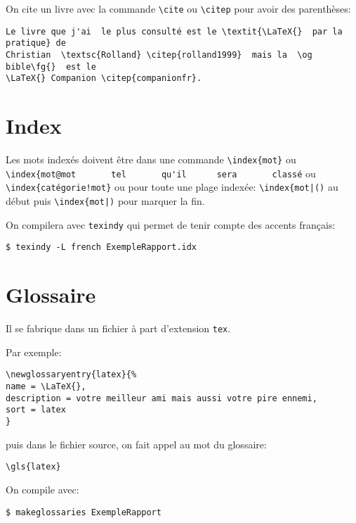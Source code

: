 \lat

On cite un  livre avec la commande \lstinline+\cite+  ou \lstinline+\citep+ pour
avoir des parenthèses:

\begin{lstlisting}
Le livre que j'ai  le plus consulté est le \textit{\LaTeX{}  par la pratique} de
Christian  \textsc{Rolland} \citep{rolland1999}  mais la  \og bible\fg{}  est le
\LaTeX{} Companion \citep{companionfr}.
\end{lstlisting}


\section{Index}


Les  mots indexés  doivent  être dans  une  commande \lstinline+\index{mot}+  ou
\lstinline+\index{mot@mot       tel       qu'il      sera       classé+       ou
  \lstinline+\index{catégorie!mot}+   ou   pour   toute   une   plage   indexée:
  \lstinline+\index{mot|()+ au début puis \lstinline+\index{mot|)+ pour 
 marquer la fin.

On compilera  avec \lstinline+texindy+  qui permet de  tenir compte  des accents
français:

\shell

\begin{lstlisting}
$ texindy -L french ExempleRapport.idx
\end{lstlisting}


\section{Glossaire}

Il se fabrique dans un fichier à part d'extension \texttt{tex}.

 Par exemple:

\lat

\begin{lstlisting}
\newglossaryentry{latex}{%
name = \LaTeX{},
description = votre meilleur ami mais aussi votre pire ennemi,
sort = latex
}
\end{lstlisting}


puis dans le fichier source, on fait appel au mot du glossaire:

\begin{lstlisting}
\gls{latex}
\end{lstlisting}

\shell

On compile avec:

\begin{lstlisting}
$ makeglossaries ExempleRapport
\end{lstlisting}


